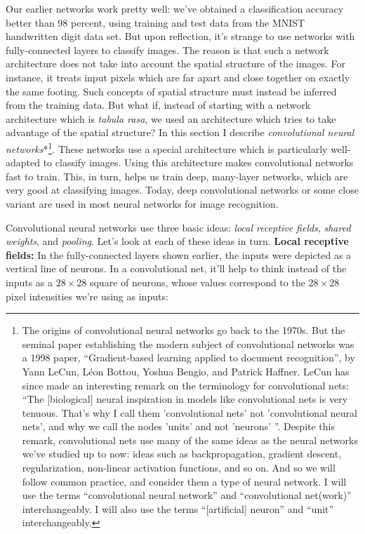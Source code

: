 Our earlier networks work pretty well: we've obtained a classification accuracy better than 98 percent, using training and test data from the MNIST handwritten digit data set. But upon reflection, it's strange to use networks with fully-connected layers to classify images. The reason is that such a network architecture does not take into account the spatial structure of the images. For instance, it treats input pixels which are far apart and close together on exactly the same footing. Such concepts of spatial structure must instead be inferred from the training data. But what if, instead of starting with a network architecture which is \emph{tabula rasa}, we used an architecture which tries to take advantage of the spatial structure? In this section I describe \emph{convolutional neural networks}*\footnote{The origins of convolutional neural networks go back to the 1970s. But the seminal paper establishing the modern subject of convolutional networks was a 1998 paper, ``Gradient-based learning applied to document recognition'', by Yann LeCun, Léon Bottou, Yoshua Bengio, and Patrick Haffner. LeCun has since made an interesting remark on the terminology for convolutional nets: ``The [biological] neural inspiration in models like convolutional nets is very tenuous. That's why I call them 'convolutional nets' not 'convolutional neural nets', and why we call the nodes 'units' and not 'neurons' ''. Despite this remark, convolutional nets use many of the same ideas as the neural networks we've studied up to now: ideas such as backpropagation, gradient descent, regularization, non-linear activation functions, and so on. And so we will follow common practice, and consider them a type of neural network. I will use the terms ``convolutional neural network'' and ``convolutional net(work)'' interchangeably. I will also use the terms ``[artificial] neuron'' and ``unit'' interchangeably.}. These networks use a special architecture which is particularly well-adapted to classify images. Using this architecture makes convolutional networks fast to train. This, in turn, helps us train deep, many-layer networks, which are very good at classifying images. Today, deep convolutional networks or some close variant are used in most neural networks for image recognition.


Convolutional neural networks use three basic ideas: \emph{local receptive fields}, \emph{shared weights}, and \emph{pooling}. Let's look at each of these ideas in turn. \textbf{Local receptive fields:} In the fully-connected layers shown earlier, the inputs were depicted as a vertical line of neurons. In a convolutional net, it'll help to think instead of the inputs as a $28 \times 28$ square of neurons, whose values correspond to the $28 \times 28$ pixel intensities we're using as inputs:


